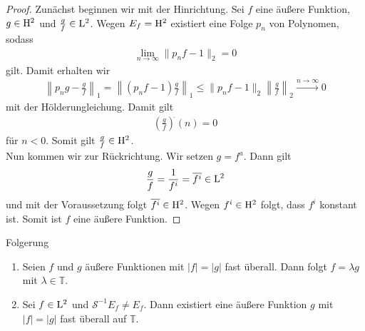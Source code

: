 \begin{proof}
	Zunächst beginnen wir mit der Hinrichtung.
	Sei $ f $ eine äußere Funktion, $ g \in \mathrm{H}^2$ und $ \frac{g}{f} \in \mathrm{L}^2 $. Wegen $ E_f = \mathrm{H}^2 $ existiert eine Folge $ p_n $ von Polynomen, sodass
	\begin{align*}
	\lim\limits_{n \to \infty} \| p_n f - 1 \|_2 = 0
	\end{align*}
	gilt. Damit erhalten wir 
	\begin{align*}
	\left\| p_n g - \frac{g}{f} \right\|_1 
	= 
	\left\| (p_n f - 1 ) \frac{g}{f} \right\|_1 
	\leq
	\| p_n f - 1 \|_2 \left\| \frac{g}{f} \right\|_2
	\stackrel{n \to \infty}{\rightarrow} 0
	\end{align*}
	mit der Hölderungleichung. Damit gilt
	\begin{align*}
	\left(\frac{g}{f}\right)^{\hat{}}(n) = 0
	\end{align*}
	für $ n <0 $. Somit gilt $ \frac{g}{f} \in \mathrm{H}^2$.\\
	Nun kommen wir zur Rückrichtung.
	Wir setzen $ g = f^a $.
	Dann gilt
	\begin{align*}
	\frac{g}{f} = \frac{1}{f^i} = \overline{f^i} \in \mathrm{L}^2
	\end{align*}
	und mit der Voraussetzung folgt $ \overline{f^i} \in \mathrm{H}^2 $.
	Wegen $ f^i \in \mathrm{H}^2 $ folgt, dass $ f^i $ konstant ist.
	Somit ist $ f $ eine äußere Funktion.
\end{proof}

\begin{genericthm}{Folgerung}\label{skript:2.4}
	\begin{enumerate}[label=\text{\textbf{(\arabic*)}}]
		\item
		Seien $ f$ und $g $ äußere Funktionen mit $ |f| = |g| $ fast überall.
		Dann folgt $ f = \lambda g $ mit $ \lambda \in \mathbb{T} $.
		
		\item Sei $ f \in \mathrm{L}^2 $ und $ \mathscr{S}^{-1} E_f \neq  E_f$.
		Dann existiert eine äußere Funktion $ g $ mit $ |f | = |g|  $ fast überall auf $ \mathbb{T} $.
		
	\end{enumerate}
\end{genericthm}

